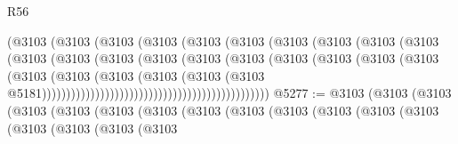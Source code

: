 \begin{lexlean}{R56}
\begin{coremodule}
{{{{{{{{{{{{{{{{{{{{{{{{{{{{{{{{{{{{{{{{{{{{{{{{{{{{{{{{{{{{{{{{{{{{{{{{{{{{{{{{{{{{{{{{{{{{{{{{{{{{{{{{{{{{{{{{{{{{{{{{{{{{{{{{{{{{{{{{{{{{{{{{{{{{{{{{{{{{{{{{{{{{{{{{{{{{{{{{{{{{{{{{{{{{{{{{{{{{{{{{{{{{{{{{{{{                                              (@3103
                                                (@3103
                                                  (@3103
                                                    (@3103
                                                      (@3103
                                                        (@3103
                                                          (@3103
                                                            (@3103
                                                              (@3103
                                                                (@3103
                                                                  (@3103
                                                                    (@3103
                                                                      (@3103
                                                                        (@3103
                                                                          (@3103
                                                                            (@3103
                                                                              (@3103
                                                                                (@3103
                                                                                  (@3103
                                                                                    (@3103
                                                                                      (@3103
                                                                                        (@3103
                                                                                          (@3103
                                                                                            (@3103
                                                                                              (@3103
                                                                                                (@3103
                                                                                                  @5181)))))))))))))))))))))))))))))))))))))))))))))))
@5277 := @3103
    (@3103
      (@3103
        (@3103
          (@3103
            (@3103
              (@3103
                (@3103
                  (@3103
                    (@3103
                      (@3103
                        (@3103
                          (@3103
                            (@3103
                              (@3103
                                (@3103
                                  (@3103
}}}}}}}}}}}}}}}}}}}}}}}}}}}}}}}}}}}}}}}}}}}}}}}}}}}}}}}}}}}}}}}}}}}}}}}}}}}}}}}}}}}}}}}}}}}}}}}}}}}}}}}}}}}}}}}}}}}}}}}}}}}}}}}}}}}}}}}}}}}}}}}}}}}}}}}}}}}}}}}}}}}}}}}}}}}}}}}}}}}}}}}}}}}}}}}}}}}}}}}}}}}}}}}}}}}
\end{coremodule}
\end{lexlean}
